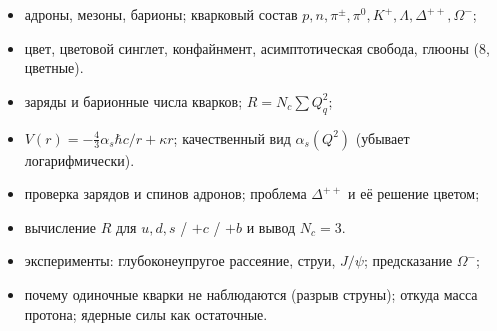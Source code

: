 \begin{examcheck}
\begin{itemize}
 \item адроны, мезоны, барионы; кварковый состав $p,n,\pi^\pm,\pi^0,K^+,\Lambda,\Delta^{++},\Omega^-$;
 \item цвет, цветовой синглет, конфайнмент, асимптотическая свобода, глюоны (8, цветные).
\end{itemize}
\begin{itemize}
 \item заряды и барионные числа кварков; $R=N_c\sum Q_q^2$;
 \item $V(r)=-\frac43\alpha_s\hbar c/r+\kappa r$; качественный вид $\alpha_s(Q^2)$ (убывает логарифмически).
\end{itemize}
\begin{itemize}
 \item проверка зарядов и спинов адронов; проблема $\Delta^{++}$ и её решение цветом;
 \item вычисление $R$ для $u,d,s$ / $+c$ / $+b$ и вывод $N_c=3$.
\end{itemize}
\begin{itemize}
 \item эксперименты: глубоконеупругое рассеяние, струи, $J/\psi$; предсказание $\Omega^-$;
 \item почему одиночные кварки не наблюдаются (разрыв струны); откуда масса протона; ядерные силы как остаточные.
\end{itemize}
\end{examcheck}
